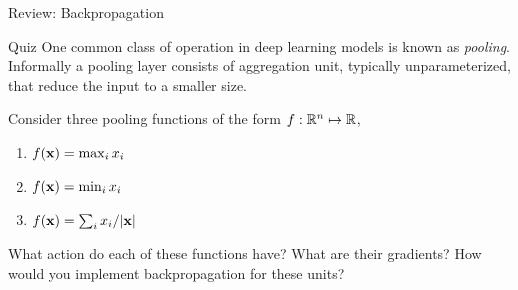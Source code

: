 \documentclass{beamer}
\begin{document}
\begin{frame}{Review: Backpropagation}
  \begin{center}

  \end{center}
\end{frame}


\begin{frame}{Quiz}
  One common class of operation in deep learning models is known as
  \textit{pooling}. Informally a pooling layer consists of aggregation
  unit, typically unparameterized, that reduce the input to a smaller
  size.
  \air

  Consider three pooling functions of the form $f: \mathbb{R}^n \mapsto \mathbb{R}$,
  \begin{enumerate}
  \item $ f(\mathbf{x}) = \max_{i} x_i $
  \item $ f(\mathbf{x}) = \min_{i} x_i $
  \item $ f(\mathbf{x}) = \sum_i x_i / |\mathbf{x}| $
  \end{enumerate}
  \air

  What action do each of these functions have? What are their gradients?
  How would you implement backpropagation for these units?
\end{frame}
\end{document}
